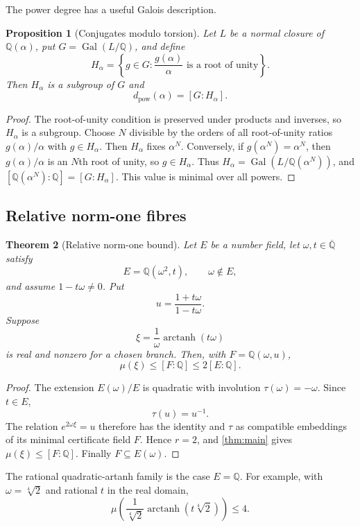 \documentclass[11pt]{article}
\newcommand{\QQ}{\mathbb Q}
\newcommand{\Qbar}{\overline{\mathbb Q}}
\DeclareMathOperator{\Gal}{Gal}
\DeclareMathOperator{\arctanh}{arctanh}
\newtheorem{theorem}{Theorem}[section]
\newtheorem{proposition}[theorem]{Proposition}
\theoremstyle{definition}
\theoremstyle{remark}
\numberwithin{equation}{section}
\begin{document}
The power degree has a useful Galois description.

\begin{proposition}[Conjugates modulo torsion]\label{prop:power-degree-galois}
Let $L$ be a normal closure of $\QQ(\alpha)$, put
$G=\Gal(L/\QQ)$, and define
\[
 H_\alpha=
 \left\{g\in G:
 \frac{g(\alpha)}{\alpha}\text{ is a root of unity}\right\}.
\]
Then $H_\alpha$ is a subgroup of $G$ and
\[
 \boxed{d_{\mathrm{pow}}(\alpha)=[G:H_\alpha].}
\]
\end{proposition}

\begin{proof}
The root-of-unity condition is preserved under products and inverses,
so $H_\alpha$ is a subgroup.  Choose $N$ divisible by the orders of all
root-of-unity ratios $g(\alpha)/\alpha$ with $g\in H_\alpha$.  Then
$H_\alpha$ fixes $\alpha^N$.  Conversely, if $g(\alpha^N)=\alpha^N$,
then $g(\alpha)/\alpha$ is an $N$th root of unity, so
$g\in H_\alpha$.  Thus
$H_\alpha=\Gal(L/\QQ(\alpha^N))$, and
$[\QQ(\alpha^N):\QQ]=[G:H_\alpha]$.  This value is minimal over all
powers.
\end{proof}

\subsection{Relative norm-one fibres}

\begin{theorem}[Relative norm-one bound]\label{thm:relative-norm-one}
Let $E$ be a number field, let $\omega,t\in\Qbar$ satisfy
\[
 E=\QQ(\omega^2,t),
 \qquad
 \omega\notin E,
\]
and assume $1-t\omega\ne0$.  Put
\[
 u=\frac{1+t\omega}{1-t\omega}.
\]
Suppose
\[
 \xi=\frac1\omega\arctanh(t\omega)
\]
is real and nonzero for a chosen branch.  Then, with
$F=\QQ(\omega,u)$,
\[
 \boxed{
 \mu(\xi)\le[F:\QQ]\le2[E:\QQ].}
\]
\end{theorem}

\begin{proof}
The extension $E(\omega)/E$ is quadratic with involution
$\tau(\omega)=-\omega$.  Since $t\in E$,
\[
 \tau(u)=u^{-1}.
\]
The relation $e^{2\omega\xi}=u$ therefore has the identity and $\tau$
as compatible embeddings of its minimal certificate field $F$.  Hence
$r=2$, and \cref{thm:main} gives
$\mu(\xi)\le[F:\QQ]$.  Finally
$F\subseteq E(\omega)$.
\end{proof}

The rational quadratic-artanh family is the case $E=\QQ$.  For example,
with $\omega=\sqrt[4]{2}$ and rational $t$ in the real domain,
\[
 \mu\left(
 \frac1{\sqrt[4]{2}}\arctanh(t\sqrt[4]{2})
 \right)\le4.
\]
\end{document}

